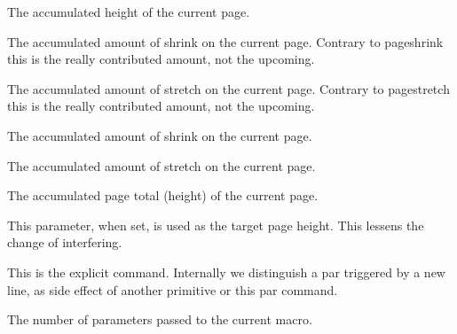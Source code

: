 \stopnewprimitive

\startnewprimitive[title={\prm {pagelastheight}}]

The accumulated height of the current page.

\stopnewprimitive

\startnewprimitive[title={\prm {pagelastshrink}}]

The accumulated amount of shrink on the current page. Contrary to \prm
{pageshrink} this is the really contributed amount, not the upcoming.

\stopnewprimitive

\startnewprimitive[title={\prm {pagelaststretch}}]

The accumulated amount of stretch on the current page. Contrary to \prm
{pagestretch} this is the really contributed amount, not the upcoming.

\stopnewprimitive

\startoldprimitive[title={\prm {pageshrink}}]

The accumulated amount of shrink on the current page.

\stopoldprimitive

\startoldprimitive[title={\prm {pagestretch}}]

The accumulated amount of stretch on the current page.

\stopoldprimitive

\startoldprimitive[title={\prm {pagetotal}}]

The accumulated page total (height) of the current page.

\stopoldprimitive

\startnewprimitive[title={\prm {pagevsize}}]

This parameter, when set, is used as the target page height. This lessens the
change of  interfering.

\stopnewprimitive

\startoldprimitive[title={\prm {par}}]

This is the explicit  command. Internally we distinguish
a par triggered by a new line, as side effect of another primitive or this \prm
{par} command.

\stopoldprimitive

\startnewprimitive[title={\prm {parametercount}}]

The number of parameters passed to the current macro.

\stopnewprimitive

\startnewprimitive[title={\prm {parameterdef}}]

